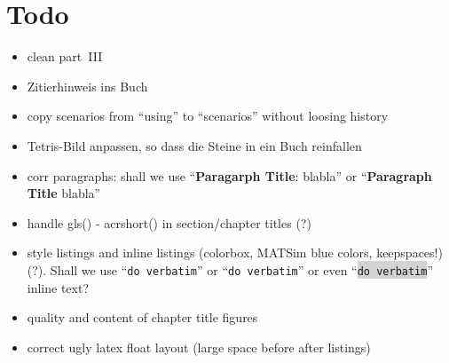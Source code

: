 \section*{Todo}

\begin{itemize}\styleItemize

\item clean part~III

\item Zitierhinweis ins Buch

\item copy scenarios from ``using'' to ``scenarios'' without loosing history

\item Tetris-Bild anpassen, so dass die Steine in ein Buch reinfallen

\item corr paragraphs: shall we use ``\textbf{Paragarph Title}: blabla'' or ``\textbf{Paragraph Title} blabla''

\item handle gls() - acrshort() in section/chapter titles (?)

\item style listings and inline listings (colorbox, MATSim blue colors, keepspaces!) (?). Shall we use ``\verb|do verbatim|'' or ``\lstinline|do verbatim|'' or even ``\colorbox{lightgray}{\lstinline|do verbatim|}'' inline text?

\item quality and content of chapter title figures

\item correct ugly latex float layout (\eg large space before after listings)









\end{itemize}



